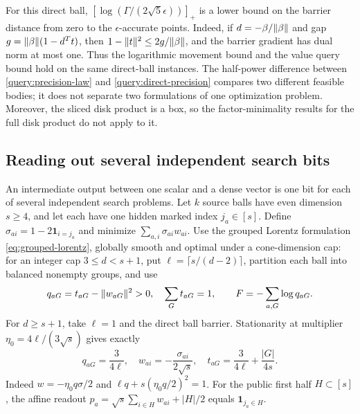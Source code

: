 For this direct ball, $[\log(\Gamma/(2\sqrt5\epsilon))]_+$ is a lower
bound on the barrier distance from zero to the $\epsilon$-accurate
points. Indeed, if $d=-\beta/\lVert \beta\rVert$ and gap $g=\lVert \beta\rVert(1-d^Tt)$, then
$1-\lVert t\rVert^2\leq2g/\lVert \beta\rVert$, and the barrier gradient has dual norm
at most one. Thus the logarithmic movement bound and the value query bound hold on the same direct-ball instances. The half-power difference
between \eqref{query:precision-law} and \eqref{query:direct-precision}
compares two different feasible bodies; it does not separate two
formulations of one optimization problem. Moreover, the sliced disk
product is a box, so the factor-minimality results for the full disk
product do not apply to it.

\subsection{Reading out several independent search bits}
An intermediate output between one scalar and a dense vector is one bit
for each of several independent search problems. Let $k$ source balls have even dimension $s\geq4$,
and let each have one hidden marked index $j_a\in[s]$. Define
$\sigma_{ai}=1-2\mathbf1_{i=j_a}$ and minimize
$\sum_{a,i}\sigma_{ai}w_{ai}$. Use the grouped Lorentz formulation
\eqref{eq:grouped-lorentz}, globally smooth and optimal under a
cone-dimension cap: for an integer cap
$3\leq d<s+1$, put
$\ell=\lceil s/(d-2)\rceil$, partition each ball into balanced nonempty
groups, and use
\[
 q_{aG}=t_{aG}-\lVert w_{aG}\rVert^2>0,\quad \sum_Gt_{aG}=1,
 \qquad F=-\sum_{a,G}\log q_{aG}.
\]
For $d\geq s+1$, take $\ell=1$ and the direct ball barrier. Stationarity
at multiplier $\eta_0=4\ell/(3\sqrt s)$ gives exactly
\begin{equation}\label{query:search-center}
 q_{aG}=\frac3{4\ell},\quad
 w_{ai}=-\frac{\sigma_{ai}}{2\sqrt s},\quad
 t_{aG}=\frac3{4\ell}+\frac{|G|}{4s}.
\end{equation}
Indeed $w=-\eta_0q\sigma/2$ and $\ell q+s(\eta_0q/2)^2=1$.
For the public first half $H\subset[s]$, the affine readout $p_a=\sqrt s\sum_{i\in H}w_{ai}+|H|/2$ equals
$\mathbf1_{j_a\in H}$.

